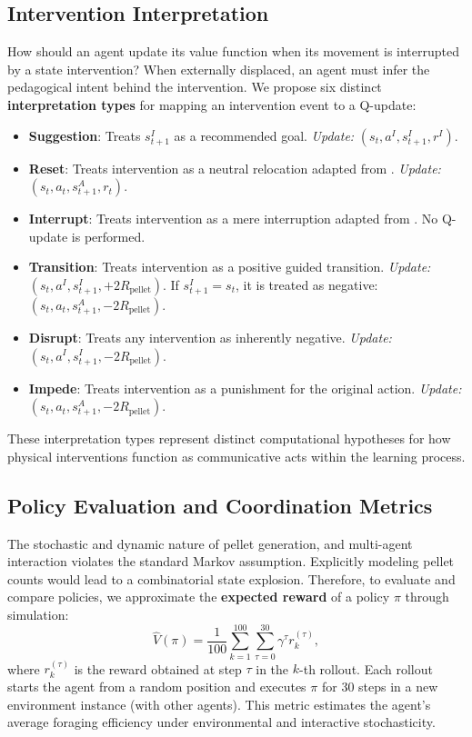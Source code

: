\documentclass[10pt,letterpaper]{article}
\begin{document}
\subsection{Intervention Interpretation}

How should an agent update its value function when its movement is interrupted by a state intervention? When externally displaced, an agent must infer the pedagogical intent behind the intervention. We propose six distinct \textbf{interpretation types} for mapping an intervention event to a Q-update:

\begin{itemize}
    \item \textbf{Suggestion}: Treats $s^I_{t+1}$ as a recommended goal. \textit{Update:} $(s_t, a^I, s^I_{t+1}, r^I)$.
    \item \textbf{Reset}: Treats intervention as a neutral relocation adapted from \cite{ho2017}. \textit{Update:} $(s_t, a_t, s^A_{t+1}, r_t)$.
    \item \textbf{Interrupt}: Treats intervention as a mere interruption adapted from \cite{ho2017}. No Q-update is performed.
    \item \textbf{Transition}: Treats intervention as a positive guided transition. \textit{Update:} $(s_t, a^I, s^I_{t+1}, +2R_{\text{pellet}})$. If $s^I_{t+1}=s_t$, it is treated as negative: $(s_t, a_t, s^A_{t+1}, -2R_{\text{pellet}})$.
    \item \textbf{Disrupt}: Treats any intervention as inherently negative. \textit{Update:} $(s_t, a^I, s^I_{t+1}, -2R_{\text{pellet}})$.
    \item \textbf{Impede}: Treats intervention as a punishment for the original action. \textit{Update:} $(s_t, a_t, s^A_{t+1}, -2R_{\text{pellet}})$.
\end{itemize}

\noindent These interpretation types represent distinct computational hypotheses for how physical interventions function as communicative acts within the learning process.

\subsection{Policy Evaluation and Coordination Metrics}

The stochastic and dynamic nature of pellet generation, and multi-agent interaction violates the standard Markov assumption. Explicitly modeling pellet counts would lead to a combinatorial state explosion. Therefore, to evaluate and compare policies, we approximate the \textbf{expected reward} of a policy $\pi$ through simulation:
\begin{equation}
    \hat{V}(\pi) = \frac{1}{100} \sum_{k=1}^{100} \sum_{\tau=0}^{30} \gamma^\tau r^{(\tau)}_{k},
\end{equation}
where $r^{(\tau)}_{k}$ is the reward obtained at step $\tau$ in the $k$-th rollout. Each rollout starts the agent from a random position and executes $\pi$ for 30 steps in a new environment instance (with other agents). This metric estimates the agent's average foraging efficiency under environmental and interactive stochasticity.
\end{document}
